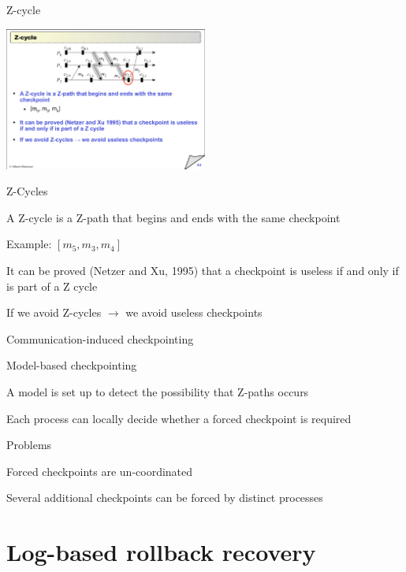 \begin{frame}{Z-cycle}
\begin{center}
\includegraphics[width=0.5\textwidth]{zpath2}
\end{center}

\begin{block}{Z-Cycles}
\BI
\item A \alert{Z-cycle} is a Z-path that begins and ends with the same checkpoint
\item Example: $[m_5, m_3, m_4]$
\item It can be proved (Netzer and Xu, 1995) that a checkpoint is useless if and 
only if is part of a Z cycle
\item  If we avoid Z-cycles $\rightarrow$ we avoid useless checkpoints
\EI
\end{block}

\end{frame}

\begin{frame}{Communication-induced checkpointing}
\BI
\item Model-based checkpointing
	\BI
	\item A model is set up to detect the possibility that Z-paths occurs 
	\item Each process can locally decide whether a forced checkpoint is required
	\EI
\item Problems
	\BI
	\item Forced checkpoints are un-coordinated
	\item Several additional checkpoints can be forced by distinct processes
	\EI
\EI
\end{frame}

\section{Log-based rollback recovery}

